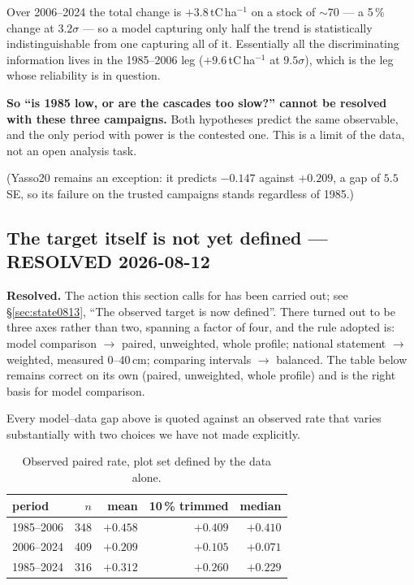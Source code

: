 \documentclass[11pt]{article}
\begin{document}
\noindent Over 2006--2024 the total change is $+3.8$\,tC\,ha$^{-1}$ on a stock of $\sim$70 --- a
5\,\% change at $3.2\sigma$ --- so a model capturing only half the trend is statistically
indistinguishable from one capturing all of it. Essentially all the discriminating information
lives in the 1985--2006 leg ($+9.6$\,tC\,ha$^{-1}$ at $9.5\sigma$), which is the leg whose
reliability is in question.

\textbf{So ``is 1985 low, or are the cascades too slow?'' cannot be resolved with these three
campaigns.} Both hypotheses predict the same observable, and the only period with power is the
contested one. This is a limit of the data, not an open analysis task.

(Yasso20 remains an exception: it predicts $-0.147$ against $+0.209$, a gap of $5.5$\,SE, so its
failure on the trusted campaigns stands regardless of 1985.)

\subsection{The target itself is not yet defined --- RESOLVED 2026-08-12}\label{sec:target}

\begin{caveat}
\textbf{Resolved.} The action this section calls for has been carried out; see
\S\ref{sec:state0813}, ``The observed target is now defined''. There turned out to be three axes
rather than two, spanning a factor of four, and the rule adopted is: model comparison
$\rightarrow$ paired, unweighted, whole profile; national statement $\rightarrow$ weighted,
measured 0--40\,cm; comparing intervals $\rightarrow$ balanced. The table below remains correct on
its own (paired, unweighted, whole profile) and is the right basis for model comparison.
\end{caveat}

Every model--data gap above is quoted against an observed rate that varies substantially with two
choices we have not made explicitly.

\begin{table}[H]\centering\small
\caption{Observed paired rate, plot set defined by the data alone.}
\begin{tabular}{lrrrr}
\toprule
period & $n$ & mean & 10\,\% trimmed & median\\
\midrule
1985--2006 & 348 & $+0.458$ & $+0.409$ & $+0.410$\\
2006--2024 & 409 & $+0.209$ & $+0.105$ & $+0.071$\\
1985--2024 & 316 & $+0.312$ & $+0.260$ & $+0.229$\\
\bottomrule
\end{tabular}
\end{table}
\end{document}
